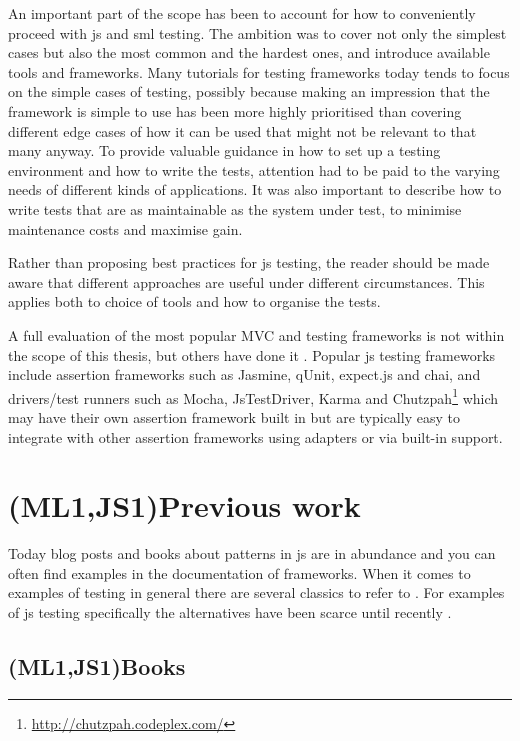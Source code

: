 \documentclass[11pt]{article}
\begin{document}
An important part of the scope has been to account for how to conveniently proceed with \gls{js} and \gls{sml} testing. The ambition was to cover not only the simplest cases but also the most common and the hardest ones, and introduce available tools and frameworks. Many tutorials for testing frameworks today tends to focus on the simple cases of testing, possibly because making an impression that the framework is simple to use has been more highly prioritised than covering different edge cases of how it can be used that might not be relevant to that many anyway. To provide valuable guidance in how to set up a testing environment and how to write the tests, attention had to be paid to the varying needs of different kinds of applications. It was also important to describe how to write tests that are as maintainable as the system under test, to minimise maintenance costs and maximise gain.

Rather than proposing best practices for \gls{js} testing, the reader should be made aware that different approaches are useful under different circumstances. This applies both to choice of tools and how to organise the tests.

A full evaluation of the most popular MVC and testing frameworks is not within the scope of this thesis, but others have done it \cite{JackFranklin}\cite{SebastianPorto}. Popular \gls{js} testing frameworks include assertion frameworks such as Jasmine, qUnit, expect.js and chai, and drivers/test runners such as Mocha, JsTestDriver, Karma and Chutzpah\footnote{\url{http://chutzpah.codeplex.com/}} which may have their own assertion framework built in but are typically easy to integrate with other assertion frameworks using adapters or via built-in support.

\section{(ML1,JS1)Previous work}
\label{sec:previouswork}

Today blog posts and books about patterns in \gls{js} are in abundance and you can often find examples in the documentation of frameworks. When it comes to examples of testing in general there are several classics to refer to \cite{KentBeck}\cite{TestPatterns}. For examples of \gls{js} testing specifically the alternatives have been scarce until recently \cite{Tddjs}\cite{BDDJS}\cite{TestableJS}\cite{JasmineBook}.

\subsection{(ML1,JS1)Books}
\end{document}
